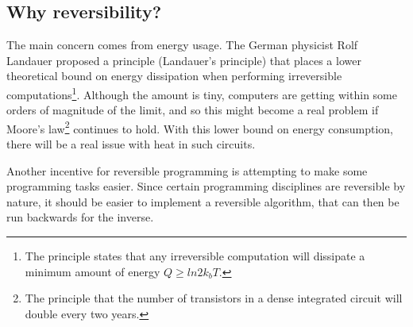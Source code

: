 \subsection{Why reversibility?}
\label{why}
The main concern comes from energy usage. The German physicist Rolf Landauer proposed a principle (Landauer's principle\cite{Landauer}) that places a lower theoretical bound on energy dissipation when performing irreversible computations\footnote{The principle states that any irreversible computation will dissipate a minimum amount of energy $Q \geq ln2 k_{b}T$.}. Although the amount is tiny, computers are getting within some orders of magnitude of the limit, and so this might become a real problem if Moore's law\footnote{The principle that the number of transistors in a dense integrated circuit will double every two years.} continues to hold. With this lower bound on energy consumption, there will be a real issue with heat in such circuits\cite{KUreverse}.

Another incentive for reversible programming is attempting to make some programming tasks easier. Since certain programming disciplines are reversible by nature, it should be easier to implement a reversible algorithm, that can then be run backwards for the inverse. 
